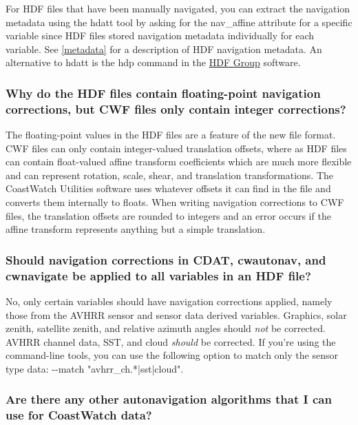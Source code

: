 For HDF files that have been manually navigated, you can extract the
navigation metadata using the hdatt tool by asking for the {\file
nav\_affine} attribute for a specific variable since HDF files stored
navigation metadata individually for each variable.  See
\autoref{metadata} for a description of HDF navigation metadata.  An
alternative to hdatt is the hdp command in the
\href{http://www.hdfgroup.org}{HDF Group} software.

\subsubsection*{Why do the HDF files contain floating-point navigation corrections, but CWF files only contain integer corrections?}

The floating-point values in the HDF files are a feature of the new
file format.  CWF files can only contain integer-valued translation
offsets, where as HDF files can contain float-valued affine transform
coefficients which are much more flexible and can represent rotation,
scale, shear, and translation transformations.  The CoastWatch
Utilities software uses whatever offsets it can find in the file and
converts them internally to floats.  When writing navigation
corrections to CWF files, the translation offsets are rounded to
integers and an error occurs if the affine transform represents
anything but a simple translation.

\subsubsection*{Should navigation corrections in CDAT, cwautonav, and cwnavigate be applied to all variables in an HDF file?}

No, only certain variables should have navigation corrections applied,
namely those from the AVHRR sensor and sensor data derived variables.
Graphics, solar zenith, satellite zenith, and relative azimuth angles
should {\em not} be corrected.  AVHRR channel data, SST, and cloud
{\em should} be corrected.  If you're using the command-line tools,
you can use the following option to match only the sensor type data:
{\file -{-}match "avhrr\_ch.*|sst|cloud"}.

\subsubsection*{Are there any other autonavigation algorithms that I can use for CoastWatch data?}

